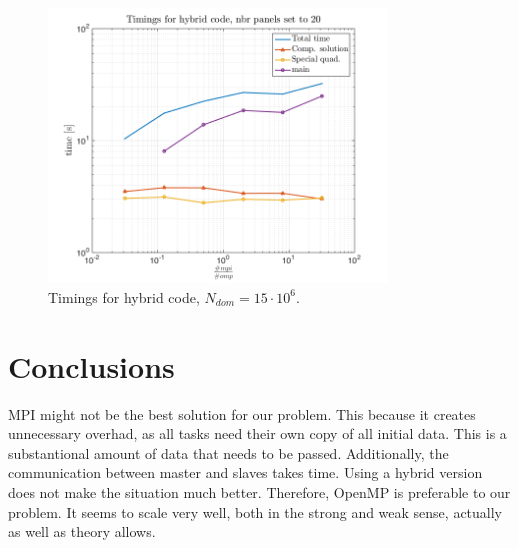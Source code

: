 \documentclass[a4paper,10pt]{article}
\begin{document}
\begin{figure}[ht]
    \begin{center}
        \includegraphics[width=0.8\textwidth]{Graphics/hybrid_plot.png}
    \end{center}
    \caption{Timings for hybrid code, $N_{dom}=15\cdot 10^6$.}
    \label{fig:hybrid}
\end{figure}
\FloatBarrier



\section*{Conclusions}
MPI might not be the best solution for our problem. This because it creates unnecessary overhad, as all tasks need their own copy of all initial data. This is a substantional amount of data that needs to be passed. Additionally, the communication between master and slaves takes time. Using a hybrid version does not make the situation much better. Therefore, OpenMP is preferable to our problem. It seems to scale very well, both in the strong and weak sense, actually as well as theory allows.

\newpage
\appendix
\end{document}
